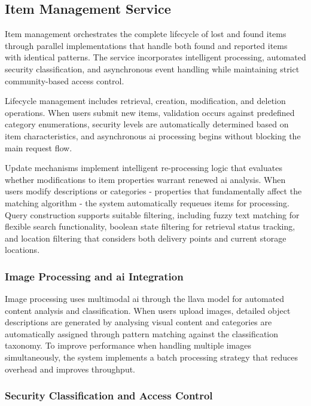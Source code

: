 \subsection{Item Management Service} \label{subsection:item_management_service}

Item management orchestrates the complete lifecycle of lost and found items through parallel implementations that handle both found and reported items with identical patterns. The service incorporates intelligent processing, automated security classification, and asynchronous event handling while maintaining strict community-based access control.

Lifecycle management includes retrieval, creation, modification, and deletion operations. When users submit new items, validation occurs against predefined category enumerations, security levels are automatically determined based on item characteristics, and asynchronous \ac{ai} processing begins without blocking the main request flow.

Update mechanisms implement intelligent re-processing logic that evaluates whether modifications to item properties warrant renewed \ac{ai} analysis. When users modify descriptions or categories - properties that fundamentally affect the matching algorithm - the system automatically requeues items for processing. Query construction supports suitable filtering, including fuzzy text matching for flexible search functionality, boolean state filtering for retrieval status tracking, and location filtering that considers both delivery points and current storage locations.

\subsubsection{Image Processing and \ac{ai} Integration}

Image processing uses multimodal \ac{ai} through the \ac{llava} model for automated content analysis and classification. When users upload images, detailed object descriptions are generated by analysing visual content and categories are automatically assigned through pattern matching against the classification taxonomy. To improve performance when handling multiple images simultaneously, the system implements a batch processing strategy that reduces overhead and improves throughput.

\subsubsection{Security Classification and Access Control}

